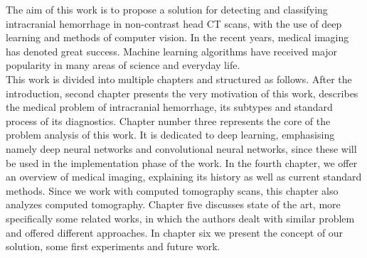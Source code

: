The aim of this work is to propose a solution for detecting and classifying intracranial hemorrhage in non-contrast head CT scans, with the use of deep learning and methods of computer vision. 
In the recent years, medical imaging has denoted great success. Machine learning algorithms have received major popularity in many areas of science and everyday life. 
\vspace{0.8cm}
\\This work is divided into multiple chapters and structured as follows. After the introduction, second chapter presents the very motivation of this work, describes the medical problem of intracranial hemorrhage, its subtypes and standard process of its diagnostics. Chapter number three represents the core of the problem analysis of this work. It is dedicated to deep learning, emphasising namely deep neural networks and convolutional neural networks, since these will be used in the implementation phase of the work. In the fourth chapter, we offer an overview of medical imaging, explaining its history as well as current standard methods. Since we work with computed tomography scans, this chapter also analyzes computed tomography. Chapter five discusses state of the art, more specifically some related works, in which the authors dealt with similar problem and offered different approaches. In chapter six we present the concept of our solution, some first experiments and future work.
